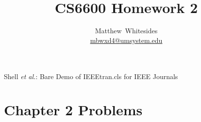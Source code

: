 \documentclass[journal,onecolumn]{IEEEtran}
\begin{document}
%
\title{CS6600 Homework 2}

%
%
%
\author{Matthew~Whitesides \\ \href{mailto:mbwxd4@umsystem.edu}{mbwxd4@umsystem.edu}}%

%
{Shell \MakeLowercase{\textit{et al.}}: Bare Demo of IEEEtran.cls for IEEE Journals}

\maketitle


\IEEEpeerreviewmaketitle

\section{Chapter 2 Problems}
\end{document}
